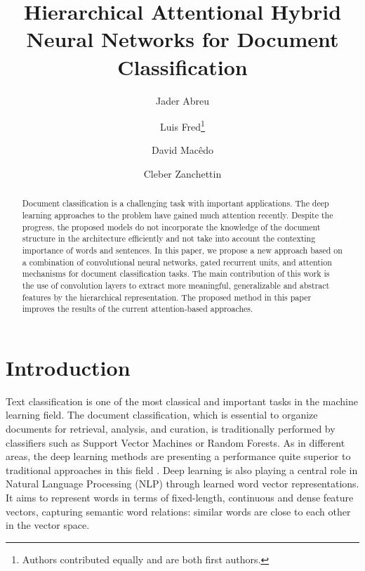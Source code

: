 \documentclass[runningheads]{llncs}
\begin{document}
\title{Hierarchical Attentional Hybrid Neural Networks for Document Classification}

\author{Jader Abreu \and
 Luis Fred\thanks{Authors contributed equally and are both first authors.} \and
David Mac\^{e}do \and
Cleber Zanchettin
}





\maketitle  

\begin{abstract}

Document classification is a challenging task with important applications. The deep learning approaches to the problem have gained much attention recently. Despite the progress, the proposed models do not incorporate the knowledge of the document structure in the architecture efficiently and not take into account the contexting importance of words and sentences. In this paper, we propose a new approach based on a combination of convolutional neural networks, gated recurrent units, and attention mechanisms for document classification tasks. The main contribution of this work is the use of convolution layers to extract more meaningful, generalizable and abstract features by the hierarchical representation. The proposed method in this paper improves the results of the current attention-based approaches.


\end{abstract}





\section{Introduction} 
\vspace{-2mm}
Text classification is one of the most classical and important tasks in the machine learning field. The document classification, which is essential to organize documents for retrieval, analysis, and curation, is traditionally performed by classifiers such as Support Vector Machines or Random Forests. As in different areas, the deep learning methods are presenting a performance quite superior to traditional approaches in this field \cite{c13}. Deep learning is also playing a central role in Natural Language Processing (NLP) through learned word vector representations. It aims to represent words in terms of fixed-length, continuous and dense feature vectors, capturing semantic word relations: similar words are close to each other in the vector space. 
\end{document}
